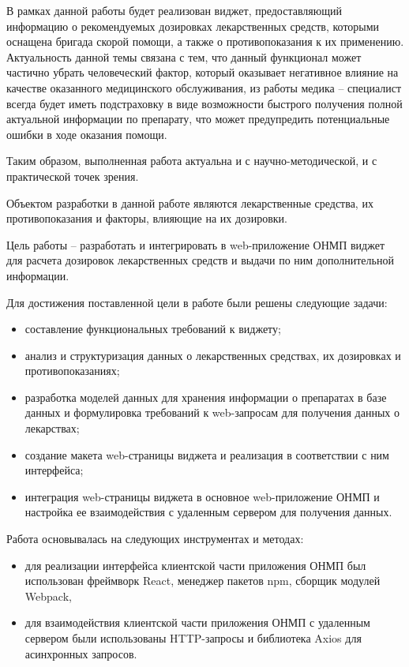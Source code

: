 В рамках данной работы будет реализован виджет, предоставляющий информацию о рекомендуемых дозировках лекарственных средств, которыми оснащена бригада скорой помощи, а также о противопоказания к их применению. Актуальность данной темы связана с тем, что данный функционал может частично убрать человеческий фактор, который оказывает негативное влияние на качестве оказанного медицинского обслуживания, из работы медика – специалист всегда будет иметь подстраховку в виде возможности быстрого получения полной актуальной информации по препарату, что может предупредить потенциальные ошибки в ходе оказания помощи. 

Таким образом, выполненная работа актуальна и с научно-методической, и с практической точек зрения.

Объектом разработки в данной работе являются лекарственные средства, их противопоказания и факторы, влияющие на их дозировки. 

Цель работы – разработать и интегрировать в web-приложение ОНМП виджет для расчета дозировок лекарственных средств и выдачи по ним дополнительной информации.

Для достижения поставленной цели в работе были решены следующие задачи:
\begin{itemize}
\item составление функциональных требований к виджету;

\item анализ и структуризация данных о лекарственных средствах, их дозировках и противопоказаниях;

\item разработка моделей данных для хранения информации о препаратах в базе данных и формулировка требований к web-запросам для получения данных о лекарствах;

\item создание макета web-страницы виджета и реализация в соответствии с ним интерфейса;

\item интеграция web-страницы виджета в основное web-приложение ОНМП и настройка ее взаимодействия  с удаленным сервером для получения данных.
\end{itemize}

Работа основывалась на следующих инструментах и методах:
\begin{itemize}
\item для реализации интерфейса клиентской части приложения ОНМП был использован фреймворк React, менеджер пакетов npm, сборщик модулей Webpack, 

\item для взаимодействия клиентской части приложения ОНМП с удаленным сервером были использованы HTTP-запросы и библиотека Axios для асинхронных запросов.
\end{itemize}

